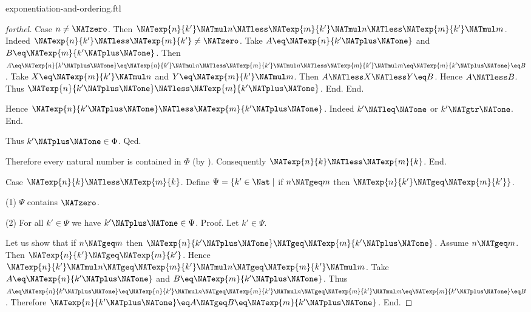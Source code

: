 \documentclass{naproche-library}
\begin{document}
\begin{smodule}[title=Exponentiation and Ordering]{exponentiation-and-ordering.ftl}
\begin{proof}[forthel]
          Case $n \neq \NATzero$.
            Then $\NATexp{n}{k'} \NATmul n
              \NATless \NATexp{m}{k'} \NATmul n
              \NATless \NATexp{m}{k'} \NATmul m$.
            Indeed $\NATexp{n}{k'} \NATless \NATexp{m}{k'} \neq \NATzero$.
            Take $A \eq \NATexp{n}{k' \NATplus \NATone}$ and $B \eq \NATexp{m}{k' \NATplus \NATone}$. %
            Then $A
              \eq \NATexp{n}{k' \NATplus \NATone}
              \eq \NATexp{n}{k'} \NATmul n
              \NATless \NATexp{m}{k'} \NATmul n
              \NATless \NATexp{m}{k'} \NATmul m
              \eq \NATexp{m}{k' \NATplus \NATone}
              \eq B$.
            Take $X \eq \NATexp{m}{k'} \NATmul n$ and $Y \eq \NATexp{m}{k'} \NATmul m$.
            Then $A \NATless X \NATless Y \eq B$.
            Hence $A \NATless B$.
            Thus $\NATexp{n}{k' \NATplus \NATone} \NATless \NATexp{m}{k' \NATplus \NATone}$.
          End.
        End.

        Hence $\NATexp{n}{k' \NATplus \NATone} \NATless \NATexp{m}{k' \NATplus \NATone}$.
        Indeed $k' \NATleq \NATone$ or $k' \NATgtr \NATone$.
      End.

      Thus $k' \NATplus \NATone \in \Phi$.
    Qed.

    Therefore every natural number is contained in $\Phi$ (by ).
    Consequently $\NATexp{n}{k} \NATless \NATexp{m}{k}$.
  End.

  Case $\NATexp{n}{k} \NATless \NATexp{m}{k}$.
    Define $\Psi = \{ k' \in \Nat \mid$ if $n \NATgeq m$ then $\NATexp{n}{k'} \NATgeq \NATexp{m}{k'} \}$.

    (1) $\Psi$ contains $\NATzero$.

    (2) For all $k' \in \Psi$ we have $k' \NATplus \NATone \in \Psi$. \newline
    Proof.
      Let $k' \in \Psi$.

      Let us show that if $n \NATgeq m$ then $\NATexp{n}{k' \NATplus \NATone} \NATgeq \NATexp{m}{k' \NATplus \NATone}$.
        Assume $n \NATgeq m$.
        Then $\NATexp{n}{k'} \NATgeq \NATexp{m}{k'}$.
        Hence $\NATexp{n}{k'} \NATmul n \NATgeq \NATexp{m}{k'} \NATmul n \NATgeq \NATexp{m}{k'} \NATmul m$.
        Take $A \eq \NATexp{n}{k' \NATplus \NATone}$ and $B \eq \NATexp{m}{k' \NATplus \NATone}$. %
        Thus $A
          \eq \NATexp{n}{k' \NATplus \NATone}
          \eq \NATexp{n}{k'} \NATmul n
          \NATgeq \NATexp{m}{k'} \NATmul n
          \NATgeq \NATexp{m}{k'} \NATmul m
          \eq \NATexp{m}{k' \NATplus \NATone}
          \eq B$.
        Therefore $\NATexp{n}{k' \NATplus \NATone} \eq A \NATgeq B \eq \NATexp{m}{k' \NATplus \NATone}$.
      End.


\end{proof}
\end{smodule}
\end{document}
